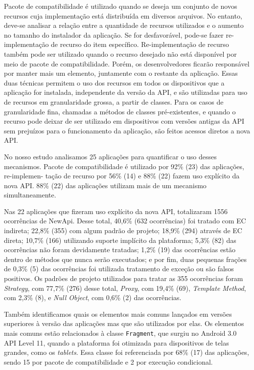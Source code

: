 Pacote de compatibilidade é utilizado quando se deseja um conjunto de novos recursos
cuja implementação está distribuída em diversos arquivos. No entanto, deve-se analisar
a relação entre a quantidade de recursos utilizados e o aumento no tamanho do instalador
da aplicação. Se for desfavorável, pode-se fazer re-implementação de recurso do item específico. Re-implementação de recurso também pode ser utilizado quando o recurso desejado
não está disponível por meio de pacote de compatibilidade. Porém, os desenvolvedores ficarão 
responsável por manter mais um elemento, juntamente com o restante da aplicação. Essas duas 
técnicas permitem o uso dos recursos em todos os dispositivos que a aplicação for instalada, 
independente da versão da API, e são utilizadas para uso de recursos em granularidade grossa,
a partir de classes. Para os casos de granularidade fina, chamadas a métodos de classes 
pré-existentes, e quando o recurso pode deixar de ser utilizado em dispositivos com versões 
antigas da API sem prejuízos para o funcionamento da aplicação, são feitos acessos diretos a 
nova API.

No nosso estudo analisamos 25 aplicações para quantificar o uso desses mecanismos.
Pacote de compatibilidade é utilizado por 92\% (23) das aplicações, re-implemen- tação
de recurso por 56\% (14) e 88\% (22) fazem uso explícito da nova API. 88\% (22) das
aplicações utilizam mais de um mecanismo simultaneamente. 

Nas 22 aplicações que fizeram uso explícito da nova API, totalizaram 1556 ocorrências
de NewApi. Desse total, 40,6\% (632 ocorrências) foi tratado com EC indireta; 22,8\%
(355) com algum padrão de projeto; 18,9\% (294) através de EC direta; 10,7\% (166)
utilizando suporte implícito da plataforma; 5,3\% (82) das ocorrências não foram devidamente 
tratadas; 1,2\% (19) das ocorrências estão dentro de métodos que nunca serão executados;
e por fim, duas pequenas frações de 0,3\% (5) das ocorrências foi utilizada tratamento
de exceção ou são falsos positivos. Os padrões de projeto utilizados para tratar as 355
ocorrências foram \textit{Strategy}, com 77,7\% (276) desse total, \textit{Proxy}, 
com 19,4\% (69), \textit{Template Method}, com 2,3\% (8), e \textit{Null Object},
com 0,6\% (2) das ocorrências. 

Também identificamos quais os elementos mais comuns lançados em versões superiores
à versão das aplicações mas que são utilizados por elas. Os elementos mais comuns
estão relacionados à classe \texttt{Fragment}, que surgiu no Android 3.0 API Level
11, quando a plataforma foi otimizada para dispositivos de telas grandes, como os
\textit{tablets}. Essa classe foi referenciada por 68\% (17) das aplicações, sendo
15 por pacote de compatibilidade e 2 por execução condicional.

